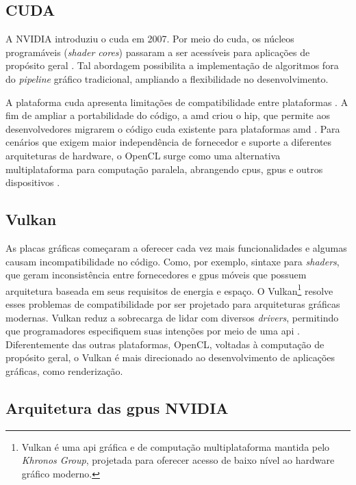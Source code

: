 \subsection{CUDA}

A NVIDIA introduziu o \gls{cuda} em 2007. Por meio do \gls{cuda}, os núcleos programáveis (\textit{shader cores}) passaram a ser acessíveis para aplicações de propósito geral \cite{laine2011high}. Tal abordagem possibilita a implementação de algoritmos fora do \textit{pipeline} gráfico tradicional, ampliando a flexibilidade no desenvolvimento.

A plataforma \gls{cuda} apresenta limitações de compatibilidade entre plataformas \cite{song2024parallel}. A fim de ampliar a portabilidade do código, a \gls{amd} criou o \gls{hip}, que permite aos desenvolvedores migrarem o código \gls{cuda} existente para plataformas \gls{amd} \cite{amd_hip_docs}. Para cenários que exigem maior independência de fornecedor e suporte a diferentes arquiteturas de hardware, o OpenCL surge como uma alternativa multiplataforma para computação paralela, abrangendo \glspl{cpu}, \glspl{gpu} e outros dispositivos \cite{song2024parallel}.



\subsection{Vulkan}

As placas gráficas começaram a oferecer cada vez mais funcionalidades e algumas causam incompatibilidade no código. Como, por exemplo, sintaxe para \textit{shaders}, que geram inconsistência entre fornecedores e \glspl{gpu} móveis que possuem arquitetura baseada em seus requisitos de energia e espaço. O Vulkan\footnote{Vulkan é uma \gls{api} gráfica e de computação multiplataforma mantida pelo \textit{Khronos Group}, projetada para oferecer acesso de baixo nível ao hardware gráfico moderno.} resolve esses problemas de compatibilidade por ser projetado para arquiteturas gráficas modernas. Vulkan reduz a sobrecarga de lidar com diversos \textit{drivers}, permitindo que programadores especifiquem suas intenções por meio de uma \gls{api} \cite{vulkan_tutorial}. Diferentemente das outras plataformas, OpenCL, voltadas à computação de propósito geral, o Vulkan é mais direcionado ao desenvolvimento de aplicações gráficas, como renderização.



\subsection{Arquitetura das \glspl{gpu} NVIDIA}

